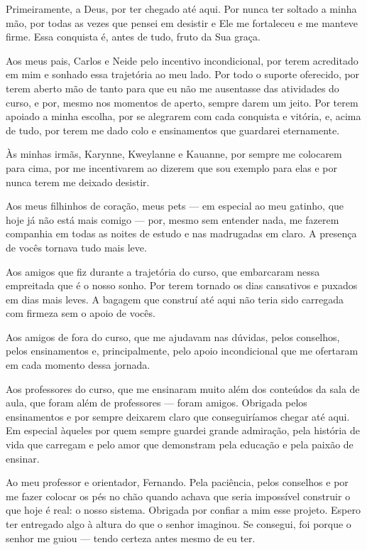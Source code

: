 \begin{agradecimentos}
Primeiramente, a Deus, por ter chegado até aqui. Por nunca ter soltado a minha mão, por todas as vezes que pensei em desistir e Ele me fortaleceu e me manteve firme. Essa conquista é, antes de tudo, fruto da Sua graça.

Aos meus pais, Carlos e Neide pelo incentivo incondicional, por terem acreditado em mim e sonhado essa trajetória ao meu lado. Por todo o suporte oferecido, por terem aberto mão de tanto para que eu não me ausentasse das atividades do curso, e por, mesmo nos momentos de aperto, sempre darem um jeito. Por terem apoiado a minha escolha, por se alegrarem com cada conquista e vitória, e, acima de tudo, por terem me dado colo e ensinamentos que guardarei eternamente.

Às minhas irmãs, Karynne, Kweylanne e Kauanne, por sempre me colocarem para cima, por me incentivarem ao dizerem que sou exemplo 
para elas e por nunca terem me deixado desistir.

Aos meus filhinhos de coração, meus pets — em especial ao meu gatinho, que hoje já não está mais comigo — por, mesmo sem entender nada, me fazerem companhia em todas as noites de estudo e nas madrugadas em claro. A presença de vocês tornava tudo mais leve.

Aos amigos que fiz durante a trajetória do curso, que embarcaram nessa empreitada que é o nosso sonho. Por terem tornado os dias cansativos e puxados em dias mais leves. A bagagem que construí até aqui não teria sido carregada com firmeza sem o apoio de vocês.

Aos amigos de fora do curso, que me ajudavam nas dúvidas, pelos conselhos, pelos ensinamentos e, principalmente, pelo apoio incondicional que me ofertaram em cada momento dessa jornada.

Aos professores do curso, que me ensinaram muito além dos conteúdos da sala de aula, que foram além de professores — foram amigos. Obrigada pelos ensinamentos e por sempre deixarem claro que conseguiríamos chegar até aqui. Em especial àqueles por quem sempre guardei grande admiração, pela história de vida que carregam e pelo amor que demonstram pela educação e pela paixão de ensinar.

Ao meu professor e orientador, Fernando. Pela paciência, pelos conselhos e por me fazer colocar os pés no chão quando achava que seria impossível construir o que hoje é real: o nosso sistema. Obrigada por confiar a mim esse projeto. Espero ter entregado algo à altura do que o senhor imaginou. Se consegui, foi porque o senhor me guiou — tendo certeza antes mesmo de eu ter.
\end{agradecimentos}